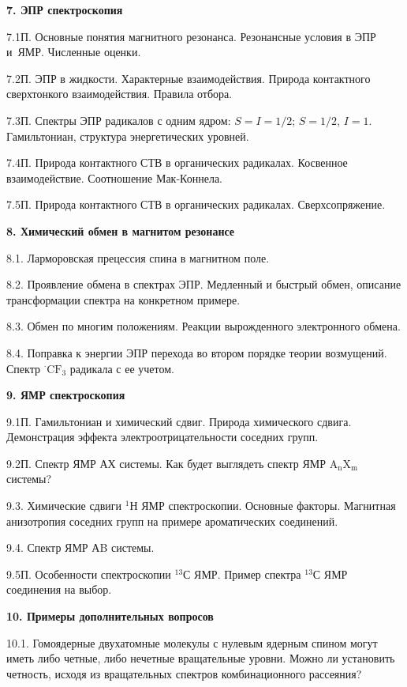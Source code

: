 \textbf{7. ЭПР спектроскопия}\par
7.1П. Основные понятия магнитного резонанса. Резонансные условия в ЭПР и~ЯМР. Численные оценки.\par
7.2П. ЭПР в жидкости. Характерные взаимодействия. Природа контактного сверхтонкого взаимодействия. Правила отбора.\par
7.3П. Спектры ЭПР радикалов с одним ядром: $S = I = 1/2$; $S = 1/2$, $I = 1$. Гамильтониан, структура энергетических уровней.\par
7.4П. Природа контактного СТВ в органических радикалах. Косвенное взаимодействие. Соотношение Мак-Коннела.\par
7.5П. Природа контактного СТВ в органических радикалах. Сверхсопряжение.\par
\textbf{8. Химический обмен в магнитом резонансе}\par
8.1. Ларморовская прецессия спина в магнитном поле.\par
8.2. Проявление обмена в спектрах ЭПР. Медленный и быстрый обмен, описание трансформации спектра на конкретном примере.\par
8.3. Обмен по многим положениям. Реакции вырожденного электронного обмена.\par
8.4. Поправка к энергии ЭПР перехода во втором порядке теории возмущений. Спектр $^{\boldsymbol{\cdot}}\text{CF}_3$ радикала с ее учетом.\par
\textbf{9. ЯМР спектроскопия}\par
9.1П. Гамильтониан и химический сдвиг. Природа химического сдвига. Демонстрация эффекта электроотрицательности соседних групп.\par
9.2П. Спектр ЯМР АХ системы. Как будет выглядеть спектр ЯМР $\text{A}_{\text{n}}\text{X}_{\text{m}}$ системы?\par
9.3. Химические сдвиги $^1$Н ЯМР спектроскопии. Основные факторы. Магнитная анизотропия соседних групп на примере ароматических соединений.\par
9.4. Спектр ЯМР АB системы.\par
9.5П. Особенности спектроскопии $^{13}$С ЯМР. Пример спектра $^{13}$С ЯМР соединения на выбор.\par
\textbf{10. Примеры дополнительных вопросов}\par
10.1. Гомоядерные двухатомные молекулы с нулевым ядерным спином могут иметь либо четные, либо нечетные вращательные уровни. Можно ли установить четность, исходя из вращательных спектров комбинационного рассеяния?\par
